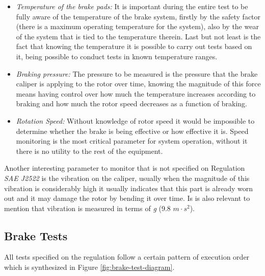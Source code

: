 			\begin{itemize}
				\item \textit{Temperature of the brake pads:} It is important during the entire test to be fully aware of the temperature of the brake system, firstly by the safety factor (there is a maximum operating temperature for the system), also by the wear of the system that is tied to the temperature therein. Last but not least is the fact that knowing the temperature it is possible to carry out tests based on it, being possible to conduct tests in known temperature ranges.\label{itm:monitored-temperature}
				\item \textit{Braking pressure:} The pressure to be measured is the pressure that the brake caliper is applying to the rotor over time, knowing the magnitude of this force means having control over how much the temperature increases according to braking and how much the rotor speed decreases as a function of braking.\label{itm:monitored-pressure}
				\item \textit{Rotation Speed:} Without knowledge of rotor speed it would be impossible to determine whether the brake is being effective or how effective it is. Speed monitoring is the most critical parameter for system operation, without it there is no utility to the rest of the equipment. \label{itm:monitored-speed}
			\end{itemize}

			Another interesting parameter to monitor that is not specified on Regulation \textit{SAE J2522} is the vibration on the caliper, usually when the magnitude of this vibration is considerably high it usually indicates that this part is already worn out \cite{goodyear-calipers} and it may damage the rotor by bending it over time. Is is also relevant to mention that vibration is measured in terms of \textit{g} (9.8 $m\cdot s^2$).

		\subsection{Brake Tests}\label{ssec:brake-tests}
			All tests specified on the regulation follow a certain pattern of execution order which is synthesized in Figure \ref{fig:brake-test-diagram}.

